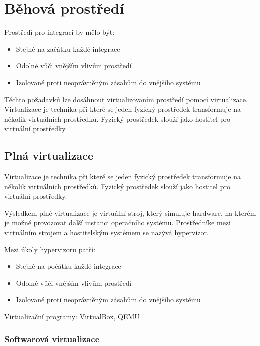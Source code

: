 \chapter{Běhová prostředí}

Prostředí pro integraci by mělo být:

\begin{itemize}
	\item Stejné na začátku každé integrace
	\item Odolné vůči vnějším vlivům prostředí
	\item Izolované proti neoprávněným zásahům do vnějšího systému
\end{itemize}

Těchto požadavků lze dosáhnout virtualizovaním prostředí pomocí virtualizace.
Virtualizace je technika při které se jeden fyzický prostředek transformuje na několik virtuálních prostředků.
Fyzický prostředek slouží jako hostitel pro virtuální prostředky.


\section{Plná virtualizace}


Virtualizace je technika při které se jeden fyzický prostředek transformuje na několik virtuálních prostředků.
Fyzický prostředek slouží jako hostitel pro virtuální prostředky.


Výsledkem plné virtualizace je virtuální stroj, který simuluje hardware, na kterém je možné provozovat další instanci operačního systému.
Prostředníke mezi virtuálním strojem a hostitelským systémem se nazývá hypervizor.

Mezi úkoly hypervizoru patří:
\begin{itemize}
	\item Stejné na počátku každé integrace
	\item Odolné vůči vnějším vlivům prostředí
	\item Izolované proti neoprávněným zásahům do vnějšího systému
\end{itemize}

Virtualizační programy: VirtualBox, QEMU

\subsection{Softwarová virtualizace}



